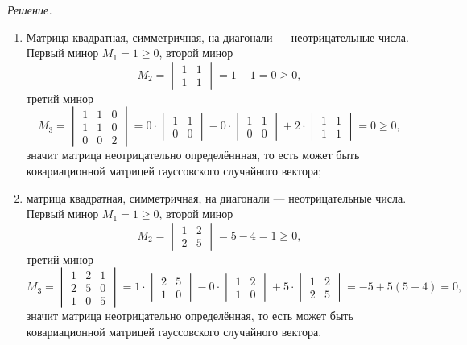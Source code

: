 \textit{Решение.}
\begin{enumerate}[label=\alph*)]
  \item Матрица квадратная, симметричная, на диагонали --- неотрицательные числа.
  Первый минор $M_1 = 1 \geq 0$, второй минор
  $$M_2 =
    \begin{vmatrix}
      1 & 1 \\
      1 & 1
    \end{vmatrix} =
    1 - 1 =
    0 \geq 0,$$
  третий минор
  $$M_3 =
    \begin{vmatrix}
      1 & 1 & 0 \\
      1 & 1 & 0 \\
      0 & 0 & 2
    \end{vmatrix} =
    0 \cdot
    \begin{vmatrix}
      1 & 1 \\
      0 & 0
    \end{vmatrix} - 0 \cdot
    \begin{vmatrix}
      1 & 1 \\
      0 & 0
    \end{vmatrix} + 2 \cdot
    \begin{vmatrix}
      1 & 1 \\
      1 & 1
    \end{vmatrix} =
    0 \geq
    0,$$
  значит матрица неотрицательно определённная,
  то есть может быть ковариационной матрицей гауссовского случайного вектора;
  \item матрица квадратная, симметричная, на диагонали --- неотрицательные числа.
  Первый минор $M_1 = 1 \geq 0$, второй минор
  $$M_2 =
    \begin{vmatrix}
      1 & 2 \\
      2 & 5
    \end{vmatrix} =
    5 - 4 =
    1 \geq
    0,$$
  третий минор
  $$M_3 =
    \begin{vmatrix}
      1 & 2 & 1 \\
      2 & 5 & 0 \\
      1 & 0 & 5
    \end{vmatrix} =
    1 \cdot
    \begin{vmatrix}
      2 & 5 \\
      1 & 0
    \end{vmatrix} - 0 \cdot
    \begin{vmatrix}
      1 & 2 \\
      1 & 0
    \end{vmatrix} + 5 \cdot
    \begin{vmatrix}
      1 & 2 \\
      2 & 5
    \end{vmatrix} =
    -5 + 5 \left( 5 - 4 \right) =
    0,$$
  значит матрица неотрицательно определённая,
  то есть может быть ковариационной матрицей гауссовского случайного вектора.
\end{enumerate}

